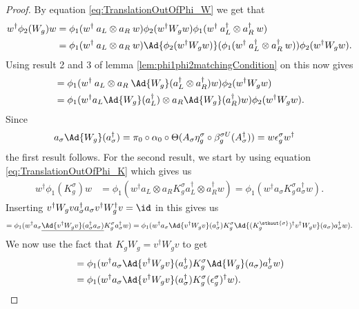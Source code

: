 \begin{proof}
	By equation \eqref{eq:TranslationOutOfPhi_W} we get that
	\begin{align}
		w^\dagger\phi_2(W_g)w&=\phi_1(w^\dagger \: a_L\otimes a_R \: w)\phi_2(w^\dagger W_g w)\phi_1(w^\dagger \: a_L^\dagger\otimes a_R^\dagger \: w)\\
		&=\phi_1(w^\dagger \: a_L\otimes a_R \: w)\Ad{\phi_2(w^\dagger W_g w)}(\phi_1(w^\dagger \: a_L^\dagger\otimes a_R^\dagger \: w))\phi_2(w^\dagger W_g w).
	\end{align}
	Using result 2 and 3 of lemma \ref{lem:phi1phi2matchingCondition} on this now gives
	\begin{align}
		&=\phi_1(w^\dagger \: a_L\otimes a_R \:\Ad{W_g}(a_L^\dagger\otimes a_R^\dagger)w)\phi_2(w^\dagger W_g w)\\
		&=\phi_1(w^\dagger a_L\Ad{W_g}(a_L^\dagger)\otimes a_R \Ad{W_g}( a_R^\dagger)w)\phi_2(w^\dagger W_g w).
	\end{align}
	Since
	\begin{align}
		a_\sigma\Ad{W_g}(a_\sigma^\dagger)&=\pi_0\circ\alpha_0\circ\Theta(A_\sigma\eta_g^\sigma\circ\beta_g^{\sigma U}(A_\sigma^\dagger))=w\epsilon_g^\sigma w^\dagger
	\end{align}
	the first result follows. For the second result, we start by using equation \eqref{eq:TranslationOutOfPhi_K} which gives us
	\begin{align}
		w^\dagger \phi_1(K_g^\sigma)w&=\phi_1(w^\dagger a_L\otimes a_R K_g^\sigma a_L^\dagger\otimes a_R^\dagger w)=\phi_1(w^\dagger a_\sigma K_g^\sigma a_\sigma^\dagger w).
	\end{align}
	Inserting $v^\dagger W_g va_\sigma^\dagger a_\sigma v^\dagger W_g^\dagger v=\id$ in this gives us
	\begin{equation}
		=\phi_1(w^\dagger a_\sigma \underline{\Ad{v^\dagger W_g v}(a_\sigma^\dagger a_\sigma)} K_g^\sigma a_\sigma^\dagger w)=\phi_1(w^\dagger a_\sigma \Ad{v^\dagger W_g v}(a_\sigma^\dagger)K_g^\sigma  \Ad{(K_g^\stkout{\sigma})^\dagger v^\dagger W_g v}(a_\sigma) a_\sigma^\dagger w).
	\end{equation}
	We now use the fact that $K_g W_g=v^\dagger W_g v$ to get
	\begin{align}
		&=\phi_1(w^\dagger a_\sigma \Ad{v^\dagger W_g v}(a_\sigma^\dagger)K_g^\sigma  \Ad{W_g}(a_\sigma) a_\sigma^\dagger w)\\
		&=\phi_1(w^\dagger a_\sigma \Ad{v^\dagger W_g v}(a_\sigma^\dagger)K_g^\sigma  (\epsilon_g^\sigma)^\dagger w).
	\end{align}

\end{proof}
